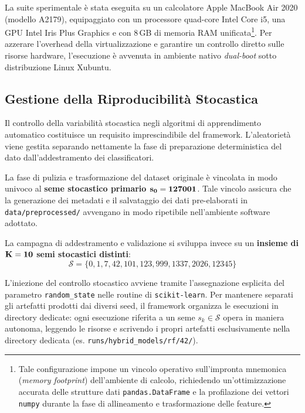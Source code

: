 La suite sperimentale è stata eseguita su un calcolatore Apple MacBook Air 2020 (modello A2179), equipaggiato con un processore quad-core Intel Core i5, una GPU Intel Iris Plus Graphics e con 8\,GB di memoria RAM unificata\footnote{Tale configurazione impone un vincolo operativo sull'impronta mnemonica (\textit{memory footprint}) dell'ambiente di calcolo, richiedendo un'ottimizzazione accurata delle strutture dati \texttt{pandas.DataFrame} e la profilazione dei vettori \texttt{numpy} durante la fase di allineamento e trasformazione delle feature.}.
Per azzerare l'overhead della virtualizzazione e garantire un controllo diretto sulle risorse hardware, l'esecuzione è avvenuta in ambiente nativo \textit{dual-boot} sotto distribuzione Linux Xubuntu.

\subsection{Gestione della Riproducibilità Stocastica}
\label{subsec:riproducibilita_seed}

Il controllo della variabilità stocastica negli algoritmi di apprendimento automatico costituisce un requisito imprescindibile del framework. 
L'aleatorietà viene gestita separando nettamente la fase di preparazione deterministica del dato dall'addestramento dei classificatori.

La fase di pulizia e trasformazione del dataset originale è vincolata in modo univoco al \textbf{seme stocastico primario $\bf{s_0 = 127001}$}. 
Tale vincolo assicura che la generazione dei metadati e il salvataggio dei dati pre-elaborati in \texttt{data/preprocessed/} avvengano in modo ripetibile nell'ambiente software adottato.

La campagna di addestramento e validazione si sviluppa invece su un \textbf{insieme di $\bf{K=10}$ semi stocastici distinti}:
\begin{equation}
    \label{eq:random_seeds}
    \mathcal{S} = \{0, 1, 7, 42, 101, 123, 999, 1337, 2026, 12345\}
\end{equation}

L'iniezione del controllo stocastico avviene tramite l'assegnazione esplicita del parametro \texttt{random\_state} nelle routine di \texttt{scikit-learn}. 
Per mantenere separati gli artefatti prodotti dai diversi seed, il framework organizza le esecuzioni in directory dedicate: ogni esecuzione riferita a un seme $s_k \in \mathcal{S}$ opera in maniera autonoma, leggendo le risorse e scrivendo i propri artefatti esclusivamente nella directory dedicata (es. \texttt{runs/hybrid\_models/rf/42/}).


